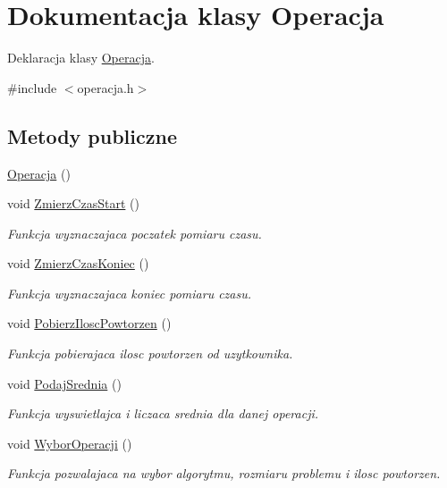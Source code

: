 \hypertarget{class_operacja}{\section{Dokumentacja klasy Operacja}
\label{class_operacja}
}


Deklaracja klasy \hyperlink{class_operacja}{Operacja}.  




{\ttfamily \#include $<$operacja.\-h$>$}

\subsection*{Metody publiczne}
\begin{DoxyCompactItemize}
\item 
\hyperlink{class_operacja_a1624fb5817c0b60e1680509fc4517732}{Operacja} ()
\item 
void \hyperlink{class_operacja_a8a31476894d307c400f965dd3dfcbb46}{Zmierz\-Czas\-Start} ()
\begin{DoxyCompactList}\small\item\em Funkcja wyznaczajaca poczatek pomiaru czasu. \end{DoxyCompactList}\item 
void \hyperlink{class_operacja_a0be771c3a85d8a53d5dba677f8cc6959}{Zmierz\-Czas\-Koniec} ()
\begin{DoxyCompactList}\small\item\em Funkcja wyznaczajaca koniec pomiaru czasu. \end{DoxyCompactList}\item 
void \hyperlink{class_operacja_a3f6cb38d924c260711fad70fe0eed35f}{Pobierz\-Ilosc\-Powtorzen} ()
\begin{DoxyCompactList}\small\item\em Funkcja pobierajaca ilosc powtorzen od uzytkownika. \end{DoxyCompactList}\item 
void \hyperlink{class_operacja_a26c10d244f0cd7b2c22e810476ee9380}{Podaj\-Srednia} ()
\begin{DoxyCompactList}\small\item\em Funkcja wyswietlajca i liczaca srednia dla danej operacji. \end{DoxyCompactList}\item 
void \hyperlink{class_operacja_a78c30760d29ccd38944962e6c71fee13}{Wybor\-Operacji} ()
\begin{DoxyCompactList}\small\item\em Funkcja pozwalajaca na wybor algorytmu, rozmiaru problemu i ilosc powtorzen. \end{DoxyCompactList}\item 

\end{DoxyCompactItemize}
